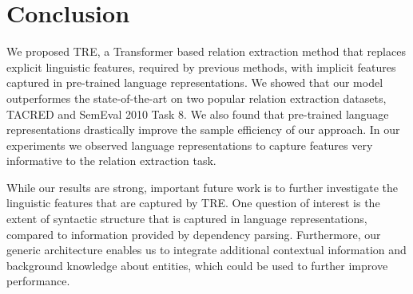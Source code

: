\documentclass[akbc,twoside,11pt]{article}
\begin{document}
\section{Conclusion}
We proposed TRE, a Transformer based relation extraction method that replaces explicit linguistic features, required by previous methods, with implicit features captured in pre-trained language representations. We showed that our model outperformes the state-of-the-art on two popular relation extraction datasets, TACRED and SemEval 2010 Task 8. We also found that pre-trained language representations drastically improve the sample efficiency of our approach. In our experiments we observed language representations to capture features very informative to the relation extraction task.

While our results are strong, important future work is to further investigate the linguistic features that are captured by TRE. One question of interest is the extent of syntactic structure that is captured in language representations, compared to information provided by dependency parsing. Furthermore, our generic architecture enables us to integrate additional contextual information and background knowledge about entities, which could be used to further improve performance.




\end{document}
